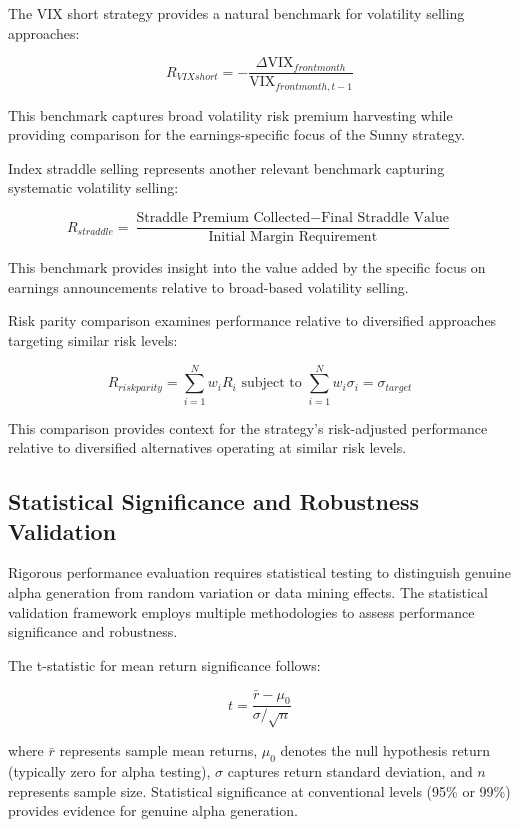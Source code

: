 \documentclass[
  american,
  11pt,
  11pt,
  letterpaper,
  onecolumn]{article}
\begin{document}
The VIX short strategy provides a natural benchmark for volatility
selling approaches:

\[R_{VIX short} = -\frac{\Delta \text{VIX}_{front month}}{\text{VIX}_{front month, t-1}}\]

This benchmark captures broad volatility risk premium harvesting while
providing comparison for the earnings-specific focus of the Sunny
strategy.

Index straddle selling represents another relevant benchmark capturing
systematic volatility selling:

\[R_{straddle} = \frac{\text{Straddle Premium Collected} - \text{Final Straddle Value}}{\text{Initial Margin Requirement}}\]

This benchmark provides insight into the value added by the specific
focus on earnings announcements relative to broad-based volatility
selling.

Risk parity comparison examines performance relative to diversified
approaches targeting similar risk levels:

\[R_{risk parity} = \sum_{i=1}^{N} w_i R_i \text{ subject to } \sum_{i=1}^{N} w_i \sigma_i = \sigma_{target}\]

This comparison provides context for the strategy's risk-adjusted
performance relative to diversified alternatives operating at similar
risk levels.

\subsection{Statistical Significance and Robustness
Validation}\label{statistical-significance-and-robustness-validation}

Rigorous performance evaluation requires statistical testing to
distinguish genuine alpha generation from random variation or data
mining effects. The statistical validation framework employs multiple
methodologies to assess performance significance and robustness.

The t-statistic for mean return significance follows:

\[t = \frac{\bar{r} - \mu_0}{\sigma / \sqrt{n}}\]

where \(\bar{r}\) represents sample mean returns, \(\mu_0\) denotes the
null hypothesis return (typically zero for alpha testing), \(\sigma\)
captures return standard deviation, and \(n\) represents sample size.
Statistical significance at conventional levels (95\% or 99\%) provides
evidence for genuine alpha generation.
\end{document}
